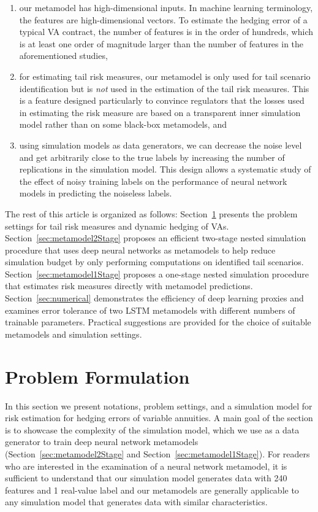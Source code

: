 \documentclass{article}
\begin{document}
\begin{enumerate}
    \item  our metamodel has high-dimensional inputs. In machine learning terminology, the features are high-dimensional vectors.
    To estimate the hedging error of a typical VA contract, the number of features is in the order of hundreds, which is at least one order of magnitude larger than the number of features in the aforementioned studies,
    \item  for estimating tail risk measures, our metamodel is only used for tail scenario identification but is \textit{not} used in the estimation of the tail risk measures.
    This is a feature designed particularly to convince regulators that the losses used in estimating the risk measure are based on a transparent inner simulation model rather than on some black-box metamodels, and
    \item  using simulation models as data generators, we can decrease the noise level and get arbitrarily close to the true labels by increasing the number of replications in the simulation model.
    This design allows a systematic study of the effect of noisy training labels on the performance of neural network models in predicting the noiseless labels.
\end{enumerate}

The rest of this article is organized as follows: 
Section~\ref{sec:problem-formulation} presents the problem settings for tail risk measures and dynamic hedging of VAs. 
Section~\ref{sec:metamodel2Stage} proposes an efficient two-stage nested simulation procedure that uses deep neural networks as metamodels to help reduce simulation budget by only performing computations on identified tail scenarios. 
Section~\ref{sec:metamodel1Stage} proposes a one-stage nested simulation procedure that estimates risk measures directly with metamodel predictions.
Section~\ref{sec:numerical} demonstrates the efficiency of deep learning proxies and examines error tolerance of two LSTM metamodels with different numbers of trainable parameters. 
Practical suggestions are provided for the choice of suitable metamodels and simulation settings. 

\section{Problem Formulation} \label{sec:problem-formulation}

In this section we present notations, problem settings, and a simulation model for risk estimation for hedging errors of variable annuities.
A main goal of the section is to showcase the complexity of the simulation model, which we use as a data generator to train deep neural network metamodels (Section~\ref{sec:metamodel2Stage} and Section~\ref{sec:metamodel1Stage}).
For readers who are interested in the examination of a neural network metamodel, it is sufficient to understand that our simulation model generates data with 240 features and 1 real-value label and our metamodels are generally applicable to any simulation model that generates data with similar characteristics.
\end{document}
